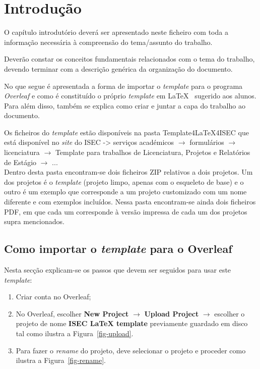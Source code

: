 
\chapter{Introdução}

O capítulo introdutório deverá ser apresentado neste ficheiro com toda a informação necessária à compreensão do tema/assunto do trabalho. 

Deverão constar os conceitos fundamentais relacionados com o tema do  trabalho, devendo terminar com a descrição genérica da organização do documento.

No que segue é apresentada a forma de importar o \textit{template} para o programa \textit{Overleaf} e como é constituído o próprio \textit{template}  em \LaTeX~ sugerido aos alunos. Para além disso, também se explica como criar e juntar a capa do trabalho ao documento.

Os ficheiros do \textit{template} estão disponíveis na pasta Template4LaTeX4ISEC que está disponível no \textit{site} do ISEC -> serviços académicos $\rightarrow$ formulários $\rightarrow$ licenciatura $\rightarrow$ Template para trabalhos de Licenciatura, Projetos e Relatórios de Estágio $\rightarrow$ ... \\
Dentro desta pasta encontram-se dois ficheiros ZIP relativos a dois projetos. Um dos projetos é o \textit{template} (projeto limpo, apenas com o esqueleto de base) e o outro é um  exemplo que corresponde a um projeto customizado com um nome diferente e com exemplos incluídos. Nessa pasta encontram-se ainda dois ficheiros PDF, em que cada um corresponde à versão impressa de cada um dos projetos supra mencionados.

\section{Como importar o \textit{template} para o Overleaf}
    Nesta secção explicam-se os passos que devem ser seguidos para usar este \textit{template}:
    \begin{enumerate}
        \item Criar conta no Overleaf;
        \item No Overleaf, escolher \textbf{New Project} $\rightarrow$ \textbf{Upload Project} $\rightarrow$ escolher o projeto de nome \textbf{ISEC LaTeX template} previamente guardado em disco tal como ilustra a  Figura~\ref{fig-upload}.
        \item Para fazer o \textit{rename} do projeto, deve selecionar o projeto e proceder como ilustra a Figura~\ref{fig-rename}.%
    \end{enumerate}
    
